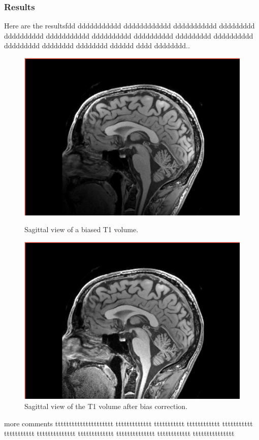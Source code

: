 \subsubsection{Results}
%
Here are the resultsfdd ddddddddddd dddddddddddd ddddddddddd ddddddddd dddddddddd ddddddddddd dddddddddd dddddddddd ddddddddd dddddddddd ddddddddd dddddddd dddddddd dddddd dddd dddddddd..
%
\par
\begin{figure}\centering
\begin{minipage}[c]{.45\textwidth}\centering
  \includegraphics[width=.95\textwidth]{Images/Screenshots/T1SagittalNotCorrected.png}
  \caption{Sagittal view of a biased T1 volume.}\label{fig:T1SagittalNotCorrected}
\end{minipage}\hfill
\begin{minipage}[c]{.45\textwidth}\centering
  \includegraphics[width=.95\textwidth]{Images/Screenshots/T1SagittalCorrected.png}
  \caption{Sagittal view of the T1 volume after bias correction.}\label{fig:T1SagittalCorrected}
\end{minipage}
\end{figure}
%
\par
more comments ttttttttttttttttttttt ttttttttttttt ttttttttttt tttttttttttt ttttttttttt ttttttttttt tttttttttttttt ttttttttttttt tttttttttttttt tttttttttttt ttttttttttttttt\\
%
